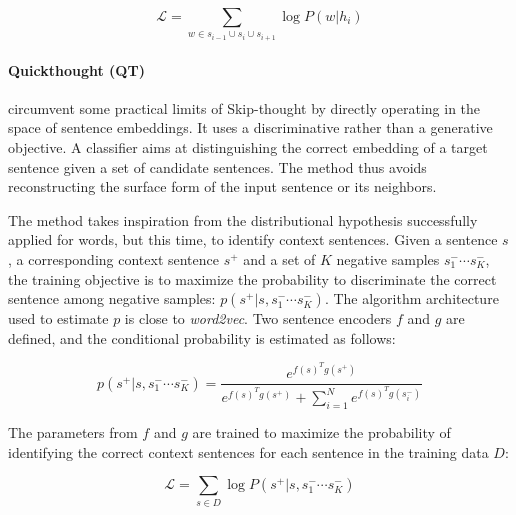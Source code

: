 \begin{equation*}
    \mathcal{L} = \sum_{w \in s_{i-1} \cup s_{i} \cup s_{i+1}} \log P(w | h_i)
\end{equation*}

\paragraph{Quickthought (QT)} \textcite{logeswaran_18} circumvent some practical limits of Skip-thought by directly operating in the space of sentence embeddings. It uses a discriminative rather than a generative objective. A classifier aims at distinguishing the correct embedding of a target sentence given a set of candidate sentences. The method thus avoids reconstructing the surface form of the input sentence or its neighbors.

The method takes inspiration from the distributional hypothesis successfully applied for words, but this time, to identify context sentences. Given a sentence $s$, a corresponding context sentence $s^+$ and a set of $K$ negative samples $s^-_1 \cdots s^-_K$, the training objective is to maximize the probability to discriminate the correct sentence among negative samples: $p(s^+ | s, s^-_1 \cdots s^-_K)$. The algorithm architecture used to estimate $p$ is close to \textsl{word2vec}. Two sentence encoders $f$ and $g$ are defined, and the conditional probability is estimated as follows:


\begin{equation*}
    p(s^+ | s, s^-_1 \cdots s^-_K) = \frac{e^{f(s)^Tg(s^+)}}{e^{f(s)^Tg(s^+)}+\sum_{i=1}^Ne^{f(s)^Tg(s^-_i)}}    
\end{equation*}

The parameters from $f$ and $g$ are trained to maximize the probability of identifying the correct context sentences for each sentence in the training data $D$:

\begin{equation*}
    \mathcal{L} = \sum_{s \in D} \log P(s^+ | s, s^-_1 \cdots s^-_K)
\end{equation*}

